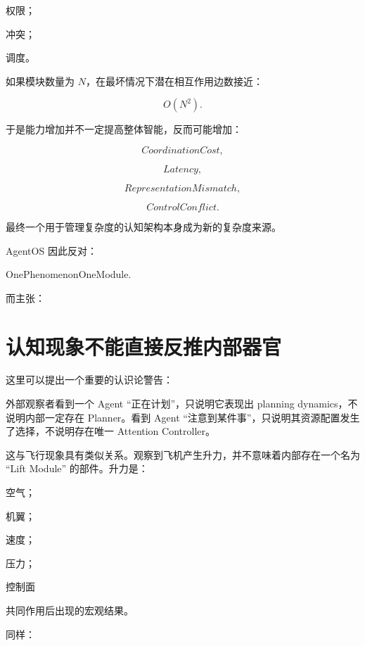 权限；

冲突；

调度。

如果模块数量为 $N$，在最坏情况下潜在相互作用边数接近：

\[
O(N^2).
\]

于是能力增加并不一定提高整体智能，反而可能增加：

\[
CoordinationCost,
\]

\[
Latency,
\]

\[
RepresentationMismatch,
\]

\[
ControlConflict.
\]

最终一个用于管理复杂度的认知架构本身成为新的复杂度来源。

AgentOS 因此反对：

\begin{statementbox}
OnePhenomenonOneModule.
\end{statementbox}

而主张：

\begin{statementbox}
\centering
{}
\end{statementbox}

\section{认知现象不能直接反推内部器官}

这里可以提出一个重要的认识论警告：

\begin{statementbox}
\centering
{}
\end{statementbox}

外部观察者看到一个 Agent ``正在计划''，只说明它表现出 planning dynamics，不说明内部一定存在 Planner。看到 Agent ``注意到某件事''，只说明其资源配置发生了选择，不说明存在唯一 Attention Controller。

这与飞行现象具有类似关系。观察到飞机产生升力，并不意味着内部存在一个名为 ``Lift Module'' 的部件。升力是：

空气；

机翼；

速度；

压力；

控制面

共同作用后出现的宏观结果。

同样：


